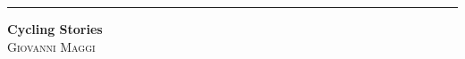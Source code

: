 \documentclass[a4paper,10pt,headinclude,footinclude,titlepage]{book} %
\begin{document}

\begin{titlepage} %
	
	\raggedleft %
	
	\rule{1pt}{\textheight} %
	\hspace{0.05\textwidth} %
	\parbox[b]{0.75\textwidth}{ %
		
		{\Huge\bfseries Cycling Stories}\\[2\baselineskip] %
		{\Large\textsc{Giovanni Maggi}} %
		
		\vspace{0.5\textheight} %
		
	}

\end{titlepage}

\cleardoublepage



\tableofcontents





\cleardoublepage


\end{document}
